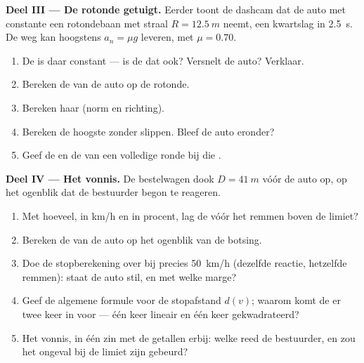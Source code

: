 \begin{problem}
\medskip
\noindent\textbf{Deel III --- De rotonde getuigt.}
Eerder toont de dashcam dat de auto met constante  een
rotondebaan met straal $R = \qty{12.5}{m}$ neemt, een kwartslag in
\qty{2.5}{s}. De weg kan hoogstens $a_n = \mu g$ leveren, met
$\mu = 0.70$.
\begin{enumerate}[resume]
  \item De  is daar constant --- is de  dat ook?
        Versnelt de auto? Verklaar.
  \item Bereken de  van de auto op de rotonde.
  \item Bereken haar  (norm en richting).
  \item Bereken de hoogste  zonder slippen. Bleef de auto
        eronder?
  \item Geef de  en de  van een volledige ronde
        bij die .
\end{enumerate}

\medskip
\noindent\textbf{Deel IV --- Het vonnis.}
De bestelwagen dook $D = \qty{41}{m}$ vóór de auto op, op het ogenblik dat
de bestuurder begon te reageren.
\begin{enumerate}[resume]
  \item Met hoeveel, in \unit{km/h} en in procent, lag de  vóór
        het remmen boven de limiet?
  \item Bereken de  van de auto op het ogenblik van de botsing.
  \item Doe de stopberekening over bij precies \qty{50}{km/h} (dezelfde
        reactie, hetzelfde remmen): staat de auto stil, en met welke
        marge?
  \item Geef de algemene formule voor de stopafstand $d(v)$; waarom komt
        de  er twee keer in voor --- één keer lineair en één keer
        gekwadrateerd?
  \item Het vonnis, in één zin met de getallen erbij: welke  reed
        de bestuurder, en zou het ongeval bij de limiet zijn gebeurd?
\end{enumerate}
\end{problem}

